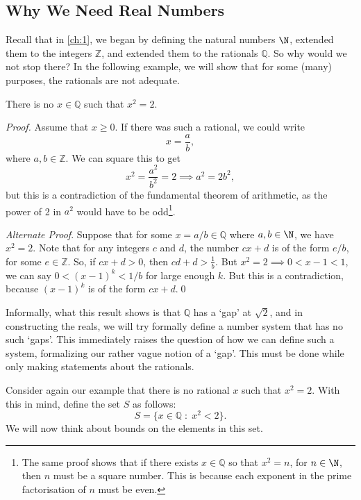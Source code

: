 \documentclass[a4paper]{scrartcl}
\begin{document}
\subsection{Why We Need Real Numbers}

Recall that in \autoref{ch:1}, we began by defining the natural numbers $\N$, extended them to the integers $\mathbb{Z}$, and extended them to the rationals $\mathbb{Q}$. So why would we not stop there? In the following example, we will show that for some (many) purposes, the rationals are not adequate.

\begin{proposition}
	There is no $x \in \mathbb{Q}$ such that $x^2 = 2$.
\end{proposition}
\begin{proof}
	Assume that $x \geq 0$. If there was such a rational, we could write
	$$
	x = \frac{a}{b},
	$$
	where $a, b \in \mathbb{Z}$. We can square this to get
	$$
	x^2 = \frac{a^2}{b^2} = 2 \implies a^2 = 2b^2,
	$$
	but this is a contradiction of the fundamental theorem of arithmetic, as the power of 2 in $a^2$ would have to be odd\footnote{The same proof shows that if there exists $x \in \mathbb{Q}$ so that $x^2 = n$, for $n \in \N$, then $n$ must be a square number. This is because each exponent in the prime factorisation of $n$ must be even.}.\hfill\qedhere

	\emph{Alternate Proof}. Suppose that for some $x = a/b \in \mathbb{Q}$ where $a, b \in \N$, we have $x^2 = 2$. Note that for any integers $c$ and $d$, the number $cx + d$ is of the form $e/b$, for some $e \in \mathbb{Z}$. So, if $cx + d > 0$, then $cd + d > \frac{1}{b}$. But $x^2 = 2 \implies 0 < x - 1 < 1$, we can say $0 < (x - 1)^k < 1/b$ for large enough $k$. But this is a contradiction, because $(x - 1)^k$ is of the form $cx + d$.\hfill\qed
\end{proof}

Informally, what this result shows is that $\mathbb{Q}$ has a `gap' at $\sqrt{2}$, and in constructing the reals, we will try formally define a number system that has no such `gaps'. This immediately raises the question of how we can define such a system, formalizing our rather vague notion of a `gap'. This must be done while only making statements about the rationals.  


Consider again our example that there is no rational $x$ such that $x^2 = 2$. With this in mind, define the set $S$ as follows:
$$
S = \{ x \in \mathbb{Q} \; : \; x^2 < 2\}.
$$
We will now think about bounds on the elements in this set.
\end{document}
